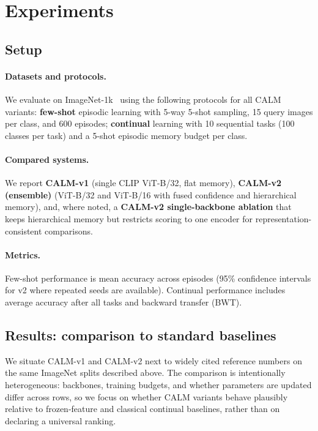 \documentclass{article}
\begin{document}
\FloatBarrier
\section{Experiments}\label{sec:experiments}

\subsection{Setup}\label{sec:exp-setup}
\paragraph{Datasets and protocols.}
We evaluate on ImageNet-1k~\citep{deng2009imagenet} using the following protocols for all CALM variants: \textbf{few-shot} episodic learning with 5-way 5-shot sampling, 15 query images per class, and 600 episodes; \textbf{continual} learning with 10 sequential tasks (100 classes per task) and a 5-shot episodic memory budget per class.

\paragraph{Compared systems.}
We report \textbf{CALM-v1} (single CLIP ViT-B/32, flat memory), \textbf{CALM-v2 (ensemble)} (ViT-B/32 and ViT-B/16 with fused confidence and hierarchical memory), and, where noted, a \textbf{CALM-v2 single-backbone ablation} that keeps hierarchical memory but restricts scoring to one encoder for representation-consistent comparisons.

\paragraph{Metrics.}
Few-shot performance is mean accuracy across episodes (95\% confidence intervals for v2 where repeated seeds are available). Continual performance includes average accuracy after all tasks and backward transfer (BWT).

\subsection{Results: comparison to standard baselines}\label{sec:results-baselines}
We situate CALM-v1 and CALM-v2 next to widely cited reference numbers on the same ImageNet splits described above. The comparison is intentionally heterogeneous: backbones, training budgets, and whether parameters are updated differ across rows, so we focus on whether CALM variants behave plausibly relative to frozen-feature and classical continual baselines, rather than on declaring a universal ranking.
\end{document}
